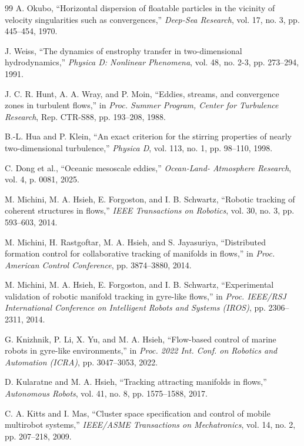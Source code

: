 \documentclass[lettersize,journal]{IEEEtran}
\begin{document}
\begin{thebibliography}{99}
 A. Okubo, ``Horizontal dispersion of floatable particles in the
vicinity of velocity singularities such as convergences,'' \textit{Deep-Sea
Research}, vol. 17, no. 3, pp. 445--454, 1970.

 J. Weiss, ``The dynamics of enstrophy transfer in two-dimensional
hydrodynamics,'' \textit{Physica D: Nonlinear Phenomena}, vol. 48, no. 2-3,
pp. 273--294, 1991.

 J. C. R. Hunt, A. A. Wray, and P. Moin, ``Eddies, streams, and
convergence zones in turbulent flows,'' in \textit{Proc. Summer Program,
Center for Turbulence Research}, Rep. CTR-S88, pp. 193--208, 1988.

 B.-L. Hua and P. Klein, ``An exact criterion for the stirring
properties of nearly two-dimensional turbulence,'' \textit{Physica D}, vol. 113,
no. 1, pp. 98--110, 1998.

 C. Dong et al., ``Oceanic mesoscale eddies,'' \textit{Ocean-Land-
Atmosphere Research}, vol. 4, p. 0081, 2025.

 M. Michini, M. A. Hsieh, E. Forgoston, and I. B. Schwartz,
``Robotic tracking of coherent structures in flows,'' \textit{IEEE Transactions
on Robotics}, vol. 30, no. 3, pp. 593--603, 2014.

 M. Michini, H. Rastgoftar, M. A. Hsieh, and S. Jayasuriya,
``Distributed formation control for collaborative tracking of manifolds in
flows,'' in \textit{Proc. American Control Conference}, pp. 3874--3880, 2014.

 M. Michini, M. A. Hsieh, E. Forgoston, and I. B. Schwartz,
``Experimental validation of robotic manifold tracking in gyre-like flows,''
in \textit{Proc. IEEE/RSJ International Conference on Intelligent Robots
and Systems (IROS)}, pp. 2306--2311, 2014.

 G. Knizhnik, P. Li, X. Yu, and M. A. Hsieh, ``Flow-based control
of marine robots in gyre-like environments,'' in \textit{Proc. 2022 Int. Conf.
on Robotics and Automation (ICRA)}, pp. 3047--3053, 2022.

 D. Kularatne and M. A. Hsieh, ``Tracking attracting manifolds in
flows,'' \textit{Autonomous Robots}, vol. 41, no. 8, pp. 1575--1588, 2017.

 C. A. Kitts and I. Mas, ``Cluster space specification and control
of mobile multirobot systems,'' \textit{IEEE/ASME Transactions on Mechatronics},
vol. 14, no. 2, pp. 207--218, 2009.


\end{thebibliography}
\end{document}
